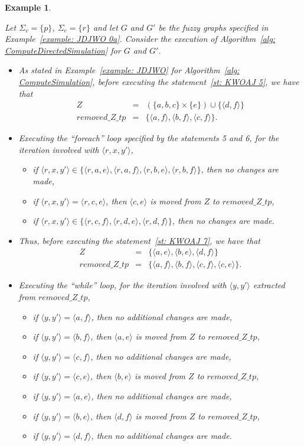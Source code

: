 \documentclass[11pt]{article}
\def\tuple#1{\langle#1\rangle}
\newcommand{\SV}{\Sigma_v}
\newcommand{\SE}{\Sigma_e}
\newcommand{\removeZ}{\textit{removed\_Z\_tp}}
\newtheorem{Example}[theorem]{Example}
\newenvironment{example}{\begin{Example}\begin{em}}{\end{em}\end{Example}}
\begin{document}
\begin{example}\label{example: JDJWO 2}
Let $\SV = \{p\}$, $\SE = \{r\}$ and let $G$ and $G'$ be the fuzzy graphs specified in Example~\ref{example: JDJWO 0a}. 
Consider the execution of Algorithm~\ref{alg: ComputeDirectedSimulation} for $G$ and $G'$.  
\begin{itemize}
\item As stated in Example~\ref{example: JDJWO} for Algorithm~\ref{alg: ComputeSimulation}, before executing the statement~\ref{st: KWOAJ 5}, we have that 
	\begin{eqnarray*}
	Z & = & (\{a,b,c\} \times \{e\}) \cup \{\tuple{d,f}\} \\
	\removeZ & = & \{\tuple{a,f},\tuple{b,f},\tuple{c,f}\}.
	\end{eqnarray*}

\item Executing the ``foreach'' loop specified by the statements 5 and 6, for the iteration involved with $\tuple{r,x,y'}$, 
	\begin{itemize}
	\item if $\tuple{r,x,y'} \in \{\tuple{r,a,e}, \tuple{r,a,f}, \tuple{r,b,e}, \tuple{r,b,f}\}$, then no changes are made, 
	\item if $\tuple{r,x,y'} = \tuple{r,c,e}$, then $\tuple{c,e}$ is moved from $Z$ to $\removeZ$, 
	\item if $\tuple{r,x,y'} \in \{\tuple{r,c,f}, \tuple{r,d,e}, \tuple{r,d,f}\}$, then no changes are made.
	\end{itemize}

\item Thus, before executing the statement~\ref{st: KWOAJ 7}, we have that 
	\begin{eqnarray*}
	Z & = & \{\tuple{a,e},\tuple{b,e},\tuple{d,f}\} \\
	\removeZ & = & \{\tuple{a,f},\tuple{b,f},\tuple{c,f},\tuple{c,e}\}.
	\end{eqnarray*}

\item Executing the ``while'' loop, for the iteration involved with $\tuple{y,y'}$ extracted from $\removeZ$, 
	\begin{itemize}
	\item if $\tuple{y,y'} = \tuple{a,f}$, then no additional changes are made, 
	\item if $\tuple{y,y'} = \tuple{b,f}$, then $\tuple{a,e}$ is moved from $Z$ to $\removeZ$, 
	\item if $\tuple{y,y'} = \tuple{c,f}$, then no additional changes are made, 
	\item if $\tuple{y,y'} = \tuple{c,e}$, then $\tuple{b,e}$ is moved from $Z$ to $\removeZ$, 
	\item if $\tuple{y,y'} = \tuple{a,e}$, then no additional changes are made, 
	\item if $\tuple{y,y'} = \tuple{b,e}$, then $\tuple{d,f}$ is moved from $Z$ to $\removeZ$, 
	\item if $\tuple{y,y'} = \tuple{d,f}$, then no additional changes are made. 
	\end{itemize}


\end{itemize}
\end{example}
\end{document}
